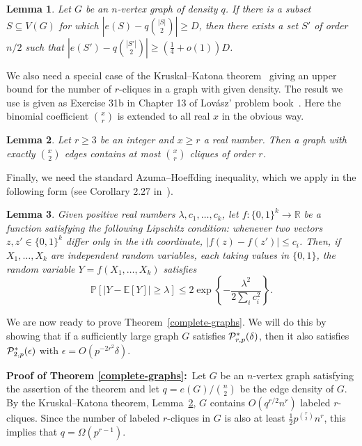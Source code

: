 \documentclass[11pt]{article}
\newtheorem{lemma}{Lemma}[section]
\begin{document}
\begin{lemma} \label{lem:EGPS}
Let $G$ be an $n$-vertex graph of density $q$. If there is a subset $S \subseteq V(G)$ for which $|e(S) - q\binom{|S|}{2}| \geq D$, then there exists a set $S'$ of order $n/2$ such that $|e(S') - q\binom{|S'|}{2}| \geq \left(\frac{1}{4}  + o(1)\right) D$.
\end{lemma}

We also need a special case of the Kruskal--Katona theorem~\cite{K68, Kr63} giving an upper bound for the number of $r$-cliques in a graph with given density. The result we use is given as Exercise 31b in Chapter 13 of Lov\'asz' problem book~\cite{Lo07}. Here the binomial coefficient $\binom{x}{r}$ is extended to all real $x$ in the obvious way.

\begin{lemma} \label{lem:KK}
Let $r \geq 3$ be an integer and $x \geq r$ a real number. Then a graph with exactly $\binom{x}{2}$ edges contains at most $\binom{x}{r}$ cliques of order $r$.
\end{lemma}

Finally, we need the standard Azuma--Hoeffding inequality, which we apply in the following form (see Corollary 2.27 in~\cite{JLR}).

\begin{lemma} \label{Azuma}
Given positive real numbers $\lambda, c_1, \dots, c_k$, let $f: \{0,1\}^k \rightarrow \mathbb{R}$ be a function satisfying the following Lipschitz condition: whenever two vectors $z, z' \in \{0,1\}^k$ differ only in the $i$th coordinate, $|f(z) - f(z')| \leq c_i$. Then, if $X_1, \dots, X_k$ are independent random variables, each taking values in $\{0,1\}$, the random variable $Y = f(X_1, \dots, X_k)$ satisfies
\[\mathbb{P}[|Y - \mathbb{E}[Y]| \geq \lambda] \leq 2 \exp\left\{- \frac{\lambda^2}{2\sum_i c_i^2}\right\}.\] 
\end{lemma}

We are now ready to prove Theorem~\ref{complete-graphs}. We will do this by showing that if a sufficiently large graph $G$ satisfies
${\cal P}^*_{r,p}(\delta)$, then it also satisfies ${\cal P}^*_{2,p}(\epsilon)$ with $\epsilon =O(p^{-2 r^2} \delta)$.

\vspace{3mm}

\noindent
{\bf Proof of Theorem \ref{complete-graphs}:}\, Let $G$ be an $n$-vertex graph satisfying the assertion of the theorem and let 
$q=e(G)/{n \choose 2}$ be the edge density of $G$. By the Kruskal--Katona theorem, Lemma~\ref{lem:KK}, $G$ contains $O(q^{r/2} n^r)$ labeled $r$-cliques. Since the number of labeled $r$-cliques in $G$ is also at least $\frac{1}{2} p^{\binom{r}{2}} n^r$, this implies that $q = \Omega(p^{r-1})$.
\end{document}
